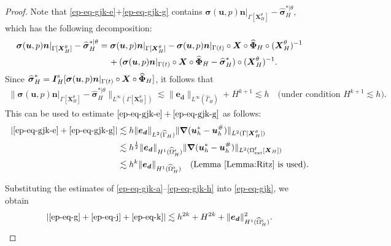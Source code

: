 \documentclass[11pt,reqno]{amsart}
\theoremstyle{definition}
\theoremstyle{plain}
\numberwithin{theorem}{section}
\numberwithin{proposition}{section}
\numberwithin{lemma}{section}
\numberwithin{equation}{section}
\newcommand{\bs}[1]{\boldsymbol{#1}}
\newcommand{\uu}[1]  {{\bs{#1}} }
\newcommand{\grad}   { \uu{\nabla}    }
\renewcommand{\(}{\bigl(}
\renewcommand{\)}{\bigr)}
\begin{document}
\begin{proof}
Note that \eqref{ep-eq-gjk-e}$+$\eqref{ep-eq-gjk-g} contains ${\bs\sigma}({\bs u},p){\bs n}|_{\Gamma[{\bs X}_H^\theta]} 
- \widehat{\bs\sigma}_H^{*|\theta} $, which has the following decomposition: 
\begin{align*}
{\bs\sigma}({\bs u},p){\bs n}|_{\Gamma[{\bs X}_H^\theta]} 
- \widehat{\bs\sigma}_H^{*|\theta} 
&= {\bs\sigma}({\bs u},p){\bs n}|_{\Gamma[{\bs X}_H^\theta]} 
- {\bs\sigma}({\bs u},p){\bs n}|_{\Gamma(t)} \circ {\bs X} \circ \widehat{\bs\Phi}_H \circ ({\bs X}_H^\theta)^{-1} \notag\\
&\quad\, 
+ ({\bs\sigma}({\bs u},p){\bs n}|_{\Gamma(t)} \circ {\bs X} \circ \widehat{\bs\Phi}_H
- \widehat{\bs\sigma}_H^*) \circ ({\bs X}_H^\theta)^{-1} . 
\end{align*}
Since $\widehat{\bs\sigma}_H^* = {\bs I}_H^{\rm s}[{\bs\sigma}({\bs u},p){\bs n}|_{\Gamma(t)} \circ {\bs X} \circ \widehat{\bs\Phi}_H]$, it follows that 
\begin{align*}
\| {\bs\sigma}({\bs u},p){\bs n}|_{\Gamma[{\bs X}_H^\theta]} 
- \widehat{\bs\sigma}_H^{*|\theta} \|_{L^\infty(\Gamma[{\bs X}_H^\theta])}
\lesssim \| {\bs e}_{\bs d} \|_{L^\infty(\widehat\Gamma_H)} + H^{k+1} 
\lesssim h \quad\mbox{(under condition $H^{k+1}\lesssim h$)} . 
\end{align*}
This can be used to estimate $\eqref{ep-eq-gjk-e}+\eqref{ep-eq-gjk-g}$ as follows: 
\begin{align}
|\eqref{ep-eq-gjk-e}+\eqref{ep-eq-gjk-g}| 
&\lesssim h \| {\bs e}_{\bs d} \|_{L^2(\widehat\Gamma_H)}
\| \grad ({\bs u}_h^*-{\bs u}_h^\#) \|_{L^2(\Gamma[{\bs X}_H^\theta])} \notag\\
&\lesssim h^{\frac12} \| {\bs e}_{\bs d} \|_{H^1(\widehat\Omega^{\rm s}_H)} \| \grad ({\bs u}_h^*-{\bs u}_h^\#) \|_{L^2(\Omega^{\rm f}_{\rm ext}[{\bs X}_H])} \notag\\
&\lesssim h^{k} \|{\bs e}_{\bs d}\|_{H^1(\widehat{\Omega}_H^{\rm s})} \quad\mbox{(Lemma \ref{Lemma:Ritz} is used)} .
\end{align}

Substituting the estimates of \eqref{ep-eq-gjk-a}--\eqref{ep-eq-gjk-h} into \eqref{ep-eq-gjk}, we obtain 
\begin{align}
|\eqref{ep-eq-g}+\eqref{ep-eq-j}+\eqref{ep-eq-k}|
\lesssim h^{2k}+H^{2k} + \|{\bs e}_{\bs d}\|_{H^1(\widehat{\Omega}_H^{\rm s})}^2 . 
\end{align}


\end{proof}
\end{document}
